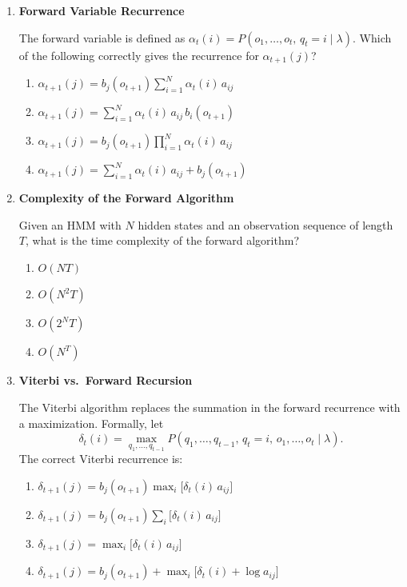 \documentclass[12pt]{article}
\begin{document}
\begin{enumerate}[label=\textbf{Q\arabic*.}, leftmargin=*, itemsep=2em]

\item \textbf{Forward Variable Recurrence}

The forward variable is defined as
$\alpha_t(i) = P(o_1, \dots, o_t,\, q_t = i \mid \lambda)$.
Which of the following correctly gives the recurrence for $\alpha_{t+1}(j)$?

\begin{enumerate}[label=\Alph*.]
    \item $\displaystyle \alpha_{t+1}(j)
          = b_j(o_{t+1})\sum_{i=1}^{N} \alpha_t(i)\, a_{ij}$
    \item $\displaystyle \alpha_{t+1}(j)
          = \sum_{i=1}^{N} \alpha_t(i)\, a_{ij}\, b_i(o_{t+1})$
    \item $\displaystyle \alpha_{t+1}(j)
          = b_j(o_{t+1})\prod_{i=1}^{N} \alpha_t(i)\, a_{ij}$
    \item $\displaystyle \alpha_{t+1}(j)
          = \sum_{i=1}^{N} \alpha_t(i)\, a_{ij} + b_j(o_{t+1})$
\end{enumerate}

\item \textbf{Complexity of the Forward Algorithm}

Given an HMM with $N$ hidden states and an observation sequence of length $T$,
what is the time complexity of the forward algorithm?

\begin{enumerate}[label=\Alph*.]
    \item $O(N T)$
    \item $O(N^2 T)$
    \item $O(2^N T)$
    \item $O(N^T)$
\end{enumerate}

\item \textbf{Viterbi vs.\ Forward Recursion}

The Viterbi algorithm replaces the summation in the forward recurrence with a
maximization. Formally, let
\[
    \delta_t(i) = \max_{q_1,\dots,q_{t-1}}
        P(q_1,\dots,q_{t-1},\, q_t=i,\, o_1,\dots,o_t \mid \lambda).
\]
The correct Viterbi recurrence is:

\begin{enumerate}[label=\Alph*.]
    \item $\displaystyle \delta_{t+1}(j)
          = b_j(o_{t+1})\max_{i}\bigl[\delta_t(i)\, a_{ij}\bigr]$
    \item $\displaystyle \delta_{t+1}(j)
          = b_j(o_{t+1})\sum_{i}\bigl[\delta_t(i)\, a_{ij}\bigr]$
    \item $\displaystyle \delta_{t+1}(j)
          = \max_{i}\bigl[\delta_t(i)\, a_{ij}\bigr]$
    \item $\displaystyle \delta_{t+1}(j)
          = b_j(o_{t+1}) + \max_{i}\bigl[\delta_t(i) + \log a_{ij}\bigr]$
\end{enumerate}


\end{enumerate}
\end{document}
